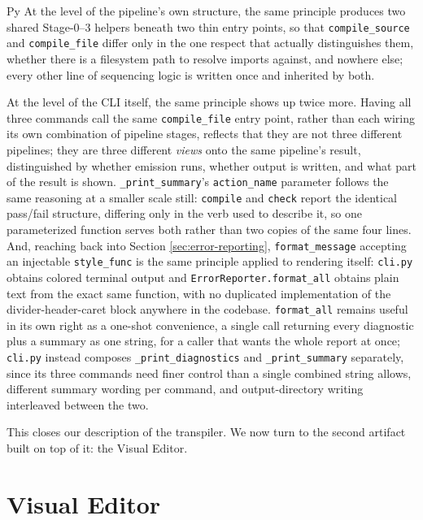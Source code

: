 \begin{codeblock}[]{Py}
At the level of the pipeline's own structure, the same principle produces two shared Stage-0–3 helpers beneath two thin entry points, so that \lstinline|compile_source| and \lstinline|compile_file| differ only in the one respect that actually distinguishes them, whether there is a filesystem path to resolve imports against, and nowhere else; every other line of sequencing logic is written once and inherited by both.

At the level of the CLI itself, the same principle shows up twice more. Having all three commands call the same \lstinline|compile_file| entry point, rather than each wiring its own combination of pipeline stages, reflects that they are not three different pipelines; they are three different \emph{views} onto the same pipeline's result, distinguished by whether emission runs, whether output is written, and what part of the result is shown. \lstinline|_print_summary|'s \lstinline|action_name| parameter follows the same reasoning at a smaller scale still: \lstinline|compile| and \lstinline|check| report the identical pass/fail structure, differing only in the verb used to describe it, so one parameterized function serves both rather than two copies of the same four lines. And, reaching back into Section \ref{sec:error-reporting}, \lstinline|format_message| accepting an injectable \lstinline|style_func| is the same principle applied to rendering itself: \lstinline|cli.py| obtains colored terminal output and \lstinline|ErrorReporter.format_all| obtains plain text from the exact same function, with no duplicated implementation of the divider-header-caret block anywhere in the codebase. \lstinline|format_all| remains useful in its own right as a one-shot convenience, a single call returning every diagnostic plus a summary as one string, for a caller that wants the whole report at once; \lstinline|cli.py| instead composes \lstinline|_print_diagnostics| and \lstinline|_print_summary| separately, since its three commands need finer control than a single combined string allows, different summary wording per command, and output-directory writing interleaved between the two.

This closes our description of the transpiler. We now turn to the second artifact built on top of it: the Visual Editor.

\section{Visual Editor}
\label{sec:editor}


\end{codeblock}
